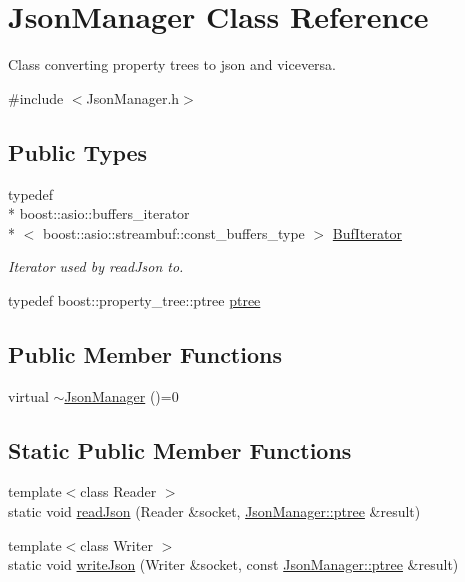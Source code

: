 \hypertarget{class_json_manager}{\section{Json\+Manager Class Reference}
\label{class_json_manager}
}


Class converting property trees to json and viceversa.  




{\ttfamily \#include $<$Json\+Manager.\+h$>$}

\subsection*{Public Types}
\begin{DoxyCompactItemize}
\item 
typedef \\*
boost\+::asio\+::buffers\+\_\+iterator\\*
$<$ boost\+::asio\+::streambuf\+::const\+\_\+buffers\+\_\+type $>$ \hyperlink{class_json_manager_a8f05d70930bca17dbe59e4a208398816}{Buf\+Iterator}
\begin{DoxyCompactList}\small\item\em Iterator used by read\+Json to. \end{DoxyCompactList}\item 
typedef boost\+::property\+\_\+tree\+::ptree \hyperlink{class_json_manager_a76d597238ac2bb690fe24acce5a3b78b}{ptree}
\end{DoxyCompactItemize}
\subsection*{Public Member Functions}
\begin{DoxyCompactItemize}
\item 
virtual \hyperlink{class_json_manager_a4d64ef1d012b8cd3af58e061b5643335}{$\sim$\+Json\+Manager} ()=0
\end{DoxyCompactItemize}
\subsection*{Static Public Member Functions}
\begin{DoxyCompactItemize}
\item 
{\footnotesize template$<$class Reader $>$ }\\static void \hyperlink{class_json_manager_a122b69a25e15dd7ab5bdc9ee84ca808b}{read\+Json} (Reader \&socket, \hyperlink{class_json_manager_a76d597238ac2bb690fe24acce5a3b78b}{Json\+Manager\+::ptree} \&result)
\item 
{\footnotesize template$<$class Writer $>$ }\\static void \hyperlink{class_json_manager_a7f80eb86717ae871369306c63baba9f1}{write\+Json} (Writer \&socket, const \hyperlink{class_json_manager_a76d597238ac2bb690fe24acce5a3b78b}{Json\+Manager\+::ptree} \&result)
\end{DoxyCompactItemize}


